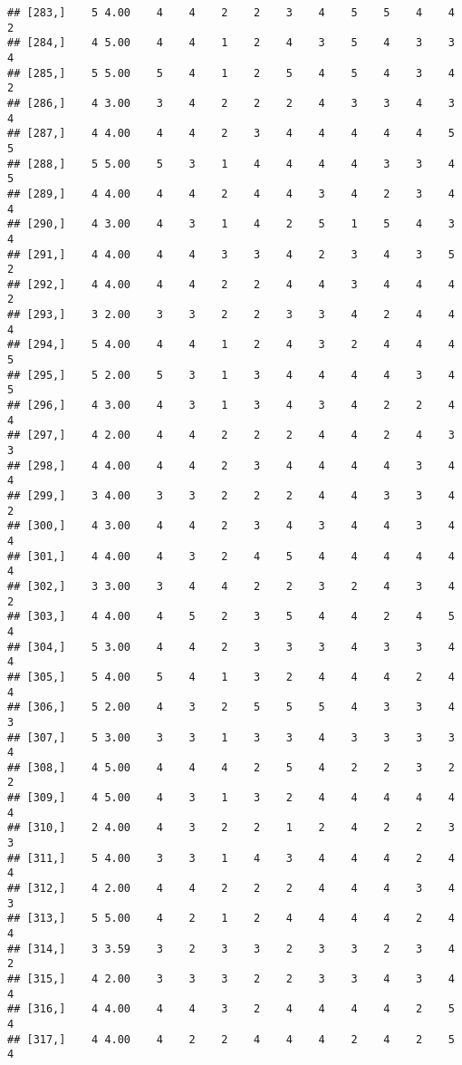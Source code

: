 \documentclass[]{article}
\begin{document}
\begin{verbatim}
## [283,]    5 4.00    4    4    2    2    3    4    5    5    4    4    2
## [284,]    4 5.00    4    4    1    2    4    3    5    4    3    3    4
## [285,]    5 5.00    5    4    1    2    5    4    5    4    3    4    2
## [286,]    4 3.00    3    4    2    2    2    4    3    3    4    3    4
## [287,]    4 4.00    4    4    2    3    4    4    4    4    4    5    5
## [288,]    5 5.00    5    3    1    4    4    4    4    3    3    4    5
## [289,]    4 4.00    4    4    2    4    4    3    4    2    3    4    4
## [290,]    4 3.00    4    3    1    4    2    5    1    5    4    3    4
## [291,]    4 4.00    4    4    3    3    4    2    3    4    3    5    2
## [292,]    4 4.00    4    4    2    2    4    4    3    4    4    4    2
## [293,]    3 2.00    3    3    2    2    3    3    4    2    4    4    4
## [294,]    5 4.00    4    4    1    2    4    3    2    4    4    4    5
## [295,]    5 2.00    5    3    1    3    4    4    4    4    3    4    5
## [296,]    4 3.00    4    3    1    3    4    3    4    2    2    4    4
## [297,]    4 2.00    4    4    2    2    2    4    4    2    4    3    3
## [298,]    4 4.00    4    4    2    3    4    4    4    4    3    4    4
## [299,]    3 4.00    3    3    2    2    2    4    4    3    3    4    2
## [300,]    4 3.00    4    4    2    3    4    3    4    4    3    4    4
## [301,]    4 4.00    4    3    2    4    5    4    4    4    4    4    4
## [302,]    3 3.00    3    4    4    2    2    3    2    4    3    4    2
## [303,]    4 4.00    4    5    2    3    5    4    4    2    4    5    4
## [304,]    5 3.00    4    4    2    3    3    3    4    3    3    4    4
## [305,]    5 4.00    5    4    1    3    2    4    4    4    2    4    4
## [306,]    5 2.00    4    3    2    5    5    5    4    3    3    4    3
## [307,]    5 3.00    3    3    1    3    3    4    3    3    3    3    4
## [308,]    4 5.00    4    4    4    2    5    4    2    2    3    2    2
## [309,]    4 5.00    4    3    1    3    2    4    4    4    4    4    4
## [310,]    2 4.00    4    3    2    2    1    2    4    2    2    3    3
## [311,]    5 4.00    3    3    1    4    3    4    4    4    2    4    4
## [312,]    4 2.00    4    4    2    2    2    4    4    4    3    4    3
## [313,]    5 5.00    4    2    1    2    4    4    4    4    2    4    4
## [314,]    3 3.59    3    2    3    3    2    3    3    2    3    4    2
## [315,]    4 2.00    3    3    3    2    2    3    3    4    3    4    4
## [316,]    4 4.00    4    4    3    2    4    4    4    4    2    5    4
## [317,]    4 4.00    4    2    2    4    4    4    2    4    2    5    4

\end{verbatim}
\end{document}
